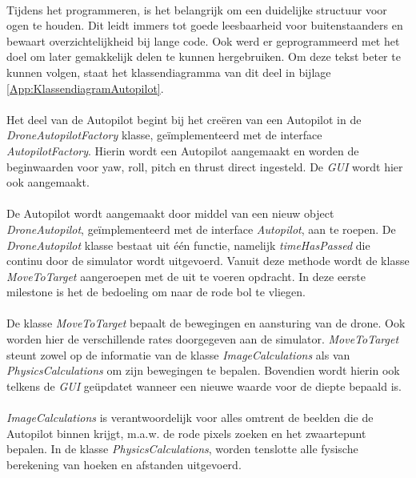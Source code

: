 \\
Tijdens het programmeren, is het belangrijk om een duidelijke structuur voor ogen te houden. Dit leidt immers tot goede leesbaarheid voor buitenstaanders en bewaart overzichtelijkheid bij lange code. Ook werd er geprogrammeerd met het doel om later gemakkelijk delen te kunnen hergebruiken. Om deze tekst beter te kunnen volgen, staat het klassendiagramma van dit deel in bijlage \ref{App:KlassendiagramAutopilot}.
\\
\\
Het deel van de Autopilot begint bij het cre\"eren van een Autopilot in de \textit{DroneAutopilotFactory} klasse, ge\"implementeerd met de interface \textit{AutopilotFactory}. Hierin wordt een Autopilot aangemaakt en worden de beginwaarden voor yaw, roll, pitch en thrust direct ingesteld. De \textit{GUI} wordt hier ook aangemaakt.
\\
\\
De Autopilot wordt aangemaakt door middel van een nieuw object \textit{DroneAutopilot}, ge\"implementeerd met de interface \textit{Autopilot}, aan te roepen. De \textit{DroneAutopilot} klasse bestaat uit één functie, namelijk \textit{timeHasPassed} die continu door de simulator wordt uitgevoerd. Vanuit deze methode wordt de klasse \textit{MoveToTarget} aangeroepen met de uit te voeren opdracht. In deze eerste milestone is het de bedoeling om naar de rode bol te vliegen.  
\\
\\
De klasse \textit{MoveToTarget} bepaalt de bewegingen en aansturing van de drone. Ook worden hier de verschillende rates doorgegeven aan de simulator. \textit{MoveToTarget} steunt zowel op de informatie van de klasse \textit{ImageCalculations} als van \textit{PhysicsCalculations} om zijn bewegingen te bepalen. Bovendien wordt hierin ook telkens de \textit{GUI} ge\"updatet wanneer een nieuwe waarde voor de diepte bepaald is.
\\
\\
\textit{ImageCalculations} is verantwoordelijk voor alles omtrent de beelden die de Autopilot binnen krijgt, m.a.w. de rode pixels zoeken en het zwaartepunt bepalen.
In de klasse \textit{PhysicsCalculations}, worden tenslotte alle fysische berekening van hoeken en afstanden uitgevoerd.